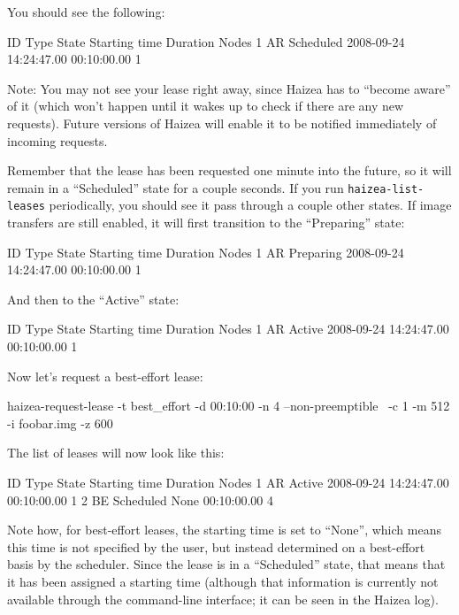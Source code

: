 You should see the following:

\begin{wideshellverbatim}
 ID   Type  State      Starting time           Duration      Nodes  
 1    AR    Scheduled  2008-09-24 14:24:47.00  00:10:00.00   1       
\end{wideshellverbatim}

Note: You may not see your lease right away, since Haizea has to ``become aware'' of it (which won't happen until it wakes up to check if there are any new requests). Future versions of Haizea will enable it to be notified immediately of incoming requests.

Remember that the lease has been requested one minute into the future, so it will remain in a ``Scheduled'' state for a couple seconds. If you run \texttt{haizea-list-leases} periodically, you should see it pass through a couple other states. If image transfers are still enabled, it will first transition to the ``Preparing'' state:

\begin{wideshellverbatim}
 ID   Type  State      Starting time           Duration      Nodes  
 1    AR    Preparing  2008-09-24 14:24:47.00  00:10:00.00   1       
\end{wideshellverbatim}

And then to the ``Active'' state:

\begin{wideshellverbatim}
 ID   Type  State      Starting time           Duration      Nodes  
 1    AR    Active     2008-09-24 14:24:47.00  00:10:00.00   1       
\end{wideshellverbatim}

Now let's request a best-effort lease:

\begin{wideshellverbatim}
haizea-request-lease -t best_effort -d 00:10:00 -n 4 --non-preemptible \
                     -c 1 -m 512 -i foobar.img -z 600
\end{wideshellverbatim}

The list of leases will now look like this:

\begin{wideshellverbatim}
 ID   Type  State      Starting time           Duration      Nodes  
 1    AR    Active     2008-09-24 14:24:47.00  00:10:00.00   1       
 2    BE    Scheduled  None                    00:10:00.00   4       
\end{wideshellverbatim}

Note how, for best-effort leases, the starting time is set to ``None'', which means this time is not specified by the user, but instead determined on a best-effort basis by the scheduler. Since the lease is in a ``Scheduled'' state, that means that it has been assigned a starting time (although that information is currently not available through the command-line interface; it can be seen in the Haizea log).

